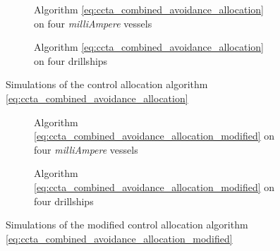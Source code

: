 \begin{figure*}[t]
    \centering
    \begin{subfigure}{\linewidth}
        \centering
        
        \vspace{-0.5em}
        \caption{Algorithm \eqref{eq:ccta_combined_avoidance_allocation} on four \emph{milliAmpere} vessels}
    \end{subfigure}
    \vspace{-1em}
    \begin{subfigure}{\linewidth}
        \centering
        
        \vspace{-2em}
        \caption{Algorithm \eqref{eq:ccta_combined_avoidance_allocation} on four drillships}
    \end{subfigure}
    \caption{Simulations of the control allocation algorithm \eqref{eq:ccta_combined_avoidance_allocation}}
    \label{fig:ccta_orig}
\end{figure*}

\begin{figure}[p]
    \centering
    \begin{subfigure}{\linewidth}
        \centering
        
        \caption{Algorithm \eqref{eq:ccta_combined_avoidance_allocation_modified} on four \emph{milliAmpere} vessels}
        \vspace*{1em}
    \end{subfigure}
    \begin{subfigure}{\linewidth}
        \centering
        
        \caption{Algorithm \eqref{eq:ccta_combined_avoidance_allocation_modified} on four drillships}
    \end{subfigure}
    \caption{Simulations of the modified control allocation algorithm \eqref{eq:ccta_combined_avoidance_allocation_modified}}
    \label{fig:ccta_modified}
\end{figure}

